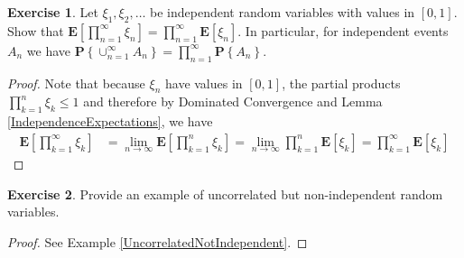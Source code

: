 \documentclass{amsbook}
\theoremstyle{definition}
\newtheorem{xca}{Exercise}
\theoremstyle{remark}
\newcommand{\expectation}[1]{\textbf{E}\left[#1\right]}
\newcommand{\probability}[1]{\textbf{P}\left \{#1 \right \}}
\begin{document}
\begin{xca}Let $\xi_1, \xi_2, \dots$ be independent random variables with values in
  $[0,1]$.  Show that $\expectation{\prod_{n =1}^\infty \xi_n} =
  \prod_{n=1}^\infty \expectation{\xi_n}$.  In particular, for
  independent events $A_n$ we have $\probability{\cup_{n=1}^\infty
    A_n} = \prod_{n=1}^\infty \probability{A_n}$.
\end{xca}
\begin{proof}
Note that because $\xi_n$ have values in $[0,1]$, the partial products
$\prod_{k=1}^n \xi_k \leq 1$ and therefore by Dominated Convergence
and Lemma \ref{IndependenceExpectations}, we have
\begin{align*}
\expectation{\prod_{k =1}^\infty \xi_k} &= \lim_{n \to \infty}
\expectation{\prod_{k=1}^n \xi_k} = \lim_{n \to \infty}
\prod_{k=1}^n\expectation{ \xi_k} = \prod_{k=1}^\infty \expectation{ \xi_k} 
\end{align*}
\end{proof}

\begin{xca}Provide an example of uncorrelated but non-independent
  random variables.
\end{xca}
\begin{proof}See Example \ref{UncorrelatedNotIndependent}.
\end{proof}
\end{document}
